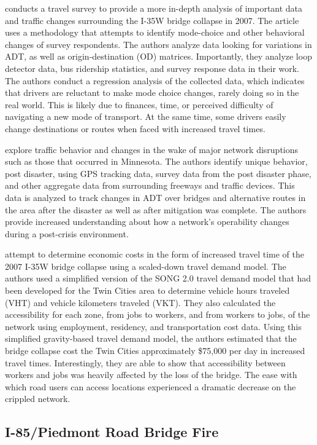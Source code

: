 \citet{zhu2010} conducts a travel survey to provide a more in-depth
analysis of important data
and traffic changes surrounding the I-35W bridge collapse in 2007. The
article uses a methodology
that attempts to identify mode-choice and other behavioral changes of
survey respondents. The
authors analyze data looking for variations in ADT, as well as origin-destination (OD) matrices.
Importantly, they analyze loop detector data, bus ridership statistics, and survey response data in their work. The
authors conduct a regression analysis of the collected data,
which indicates that drivers are reluctant to make mode choice changes,
rarely doing so in the real world. This is
likely due to finances, time, or perceived difficulty of
navigating a new mode of
transport. At the same time, some drivers easily change destinations or routes when faced
with increased travel
times.

\citet{levinson2010} explore traffic behavior and changes in the wake of
major network
disruptions such as those that occurred in Minnesota. The authors identify
unique behavior, post
disaster, using GPS tracking data, survey data from the post disaster
phase, and other aggregate
data from surrounding freeways and traffic devices. This data is
analyzed to track
changes in ADT over bridges and alternative routes in the area after the
disaster as well as
after mitigation was complete. The authors provide increased
understanding about how a
network's operability changes during a post-crisis environment.

\citet{xie2011} attempt to determine economic costs in the form of
increased travel time
of the 2007 I-35W bridge collapse using a scaled-down travel demand model.
The authors used a
simplified version of the SONG 2.0 travel demand model that had been
developed for the Twin
Cities area to determine vehicle hours traveled (VHT) and vehicle
kilometers traveled (VKT). They
also calculated the accessibility for each zone, from jobs to workers, and
from workers to jobs, of
the network using employment, residency, and transportation cost data.
Using this simplified
gravity-based travel demand model, the authors estimated that the bridge collapse cost the Twin
Cities approximately
\$75,000 per day in increased travel times. Interestingly, they are able to
show that accessibility between workers and jobs was heavily affected by the
loss of the bridge. The ease with which road users can access locations
experienced a dramatic decrease on the crippled network.

\subsection{I-85/Piedmont Road Bridge Fire}

